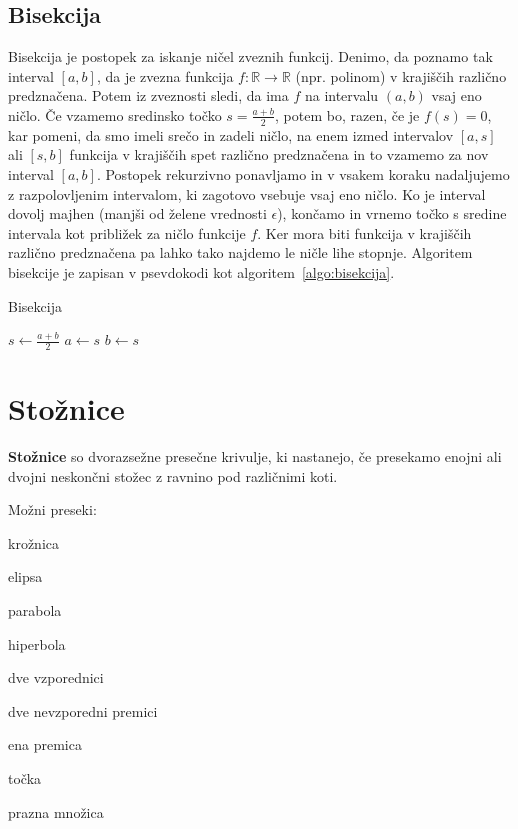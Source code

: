 \documentclass[a4paper,oneside,12pt,fleqn]{article}
\def\R{\ensuremath{\mathbb R}}
\numberwithin{equation}{section}
\newenvironment{itemize*}%
{
\vspace{-12pt}%
\begin{itemize}%
\setlength{\itemsep}{0pt}%
\setlength{\parskip}{2pt}}%
{\end{itemize}}
\begin{document}
\subsection{Bisekcija}
\label{sec:pol:bisekcija}
Bisekcija je postopek za iskanje ničel zveznih funkcij. Denimo, da poznamo tak interval $[a, b]$,
da je zvezna funkcija $f\colon \R \rightarrow \R$ (npr. polinom) v krajiščih različno predznačena.
Potem iz zveznosti sledi, da ima $f$ na intervalu $(a, b)$ vsaj eno ničlo. Če vzamemo sredinsko
točko $s = \frac{a + b}{2}$, potem bo, razen, če je $f(s) = 0$, kar pomeni, da smo imeli srečo in
zadeli ničlo, na enem izmed intervalov $[a, s]$ ali $[s, b]$ funkcija v krajiščih spet različno
predznačena in to vzamemo za nov interval $[a, b]$. Postopek rekurzivno ponavljamo in v vsakem
koraku nadaljujemo z razpolovljenim intervalom, ki zagotovo vsebuje vsaj eno ničlo. Ko je interval
dovolj majhen (manjši od želene vrednosti $\epsilon$), končamo in vrnemo točko s sredine intervala
kot približek za ničlo funkcije $f$. Ker mora biti funkcija v krajiščih različno
predznačena pa lahko tako najdemo le ničle lihe stopnje.
Algoritem bisekcije je zapisan v psevdokodi kot algoritem~\ref{algo:bisekcija}.

\begin{algorithm}[h!]
  \caption{Bisekcija}\label{algo:bisekcija}
  \begin{algorithmic}[1]
        \State $s \gets \frac{a+b}{2}$
          \State $a \gets s$
        \Else
          \State $b \gets s$
        \EndIf
    \EndWhile
  \end{algorithmic}
\end{algorithm}

\section{Stožnice}
\label{sec:stoz}
\textbf{Stožnice} so dvorazsežne presečne krivulje, ki nastanejo, če presekamo enojni ali dvojni
neskončni stožec z ravnino pod različnimi koti.

Možni preseki:
\begin{itemize*}
  \item krožnica
  \item elipsa
  \item parabola
  \item hiperbola
  \item dve vzporednici
  \item dve nevzporedni premici
  \item ena premica
  \item točka
  \item prazna množica
\end{itemize*}
\end{document}
